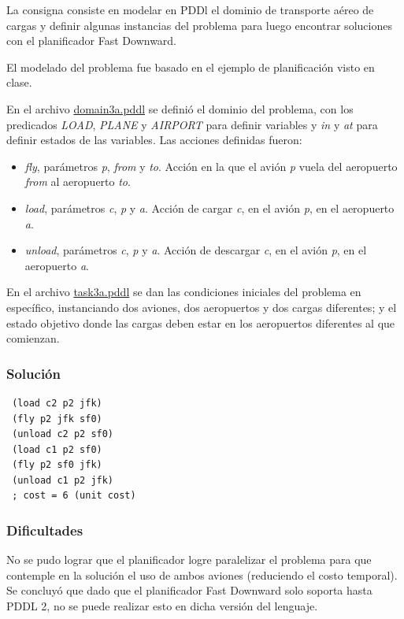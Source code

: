 \documentclass[onecolumn]{article}
\providecommand{\tightlist}{%
  \setlength{\itemsep}{0pt}\setlength{\parskip}{0pt}}
\begin{document}
La consigna consiste en modelar en PDDl el dominio de transporte aéreo
de cargas y definir algunas instancias del problema para luego encontrar
soluciones con el planificador Fast Downward.

El modelado del problema fue basado en el ejemplo de planificación visto
en clase.

En el archivo \href{planning/domain3a.pddl}{domain3a.pddl} se definió el
dominio del problema, con los predicados \emph{LOAD}, \emph{PLANE} y
\emph{AIRPORT} para definir variables y \emph{in} y \emph{at} para
definir estados de las variables. Las acciones definidas fueron:

\begin{itemize}
\tightlist
\item
  \emph{fly}, parámetros \emph{p}, \emph{from} y \emph{to}. Acción en la
  que el avión \emph{p} vuela del aeropuerto \emph{from} al aeropuerto
  \emph{to}.
\item
  \emph{load}, parámetros \emph{c}, \emph{p} y \emph{a}. Acción de
  cargar \emph{c}, en el avión \emph{p}, en el aeropuerto \emph{a}.
\item
  \emph{unload}, parámetros \emph{c}, \emph{p} y \emph{a}. Acción de
  descargar \emph{c}, en el avión \emph{p}, en el aeropuerto \emph{a}.
\end{itemize}

En el archivo \href{planning/task3a.pddl}{task3a.pddl} se dan las
condiciones iniciales del problema en específico, instanciando dos
aviones, dos aeropuertos y dos cargas diferentes; y el estado objetivo
donde las cargas deben estar en los aeropuertos diferentes al que
comienzan.

\hypertarget{soluciuxf3n}{%
\subsubsection{Solución}\label{soluciuxf3n}}

\begin{verbatim}
 (load c2 p2 jfk)
 (fly p2 jfk sf0)
 (unload c2 p2 sf0)
 (load c1 p2 sf0)
 (fly p2 sf0 jfk)
 (unload c1 p2 jfk)
 ; cost = 6 (unit cost)
\end{verbatim}

\hypertarget{dificultades}{%
\subsubsection{Dificultades}\label{dificultades}}

No se pudo lograr que el planificador logre paralelizar el problema para
que contemple en la solución el uso de ambos aviones (reduciendo el
costo temporal). Se concluyó que dado que el planificador Fast Downward
solo soporta hasta PDDL 2, no se puede realizar esto en dicha versión
del lenguaje.
\end{document}
